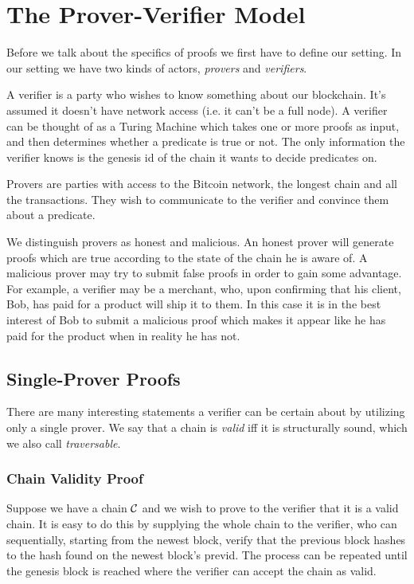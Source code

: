 \section{The Prover-Verifier Model}
Before we talk about the specifics of proofs we first have to define our setting. In our setting we have two kinds of actors, \emph{provers} and \emph{verifiers}.

A verifier is a party who wishes to know something about our blockchain. It's assumed it doesn't have network access (i.e. it can't be a full node). A verifier can be thought of as a Turing Machine which takes one or more proofs as input, and then determines whether a predicate is true or not. The only information the verifier knows is the genesis id of the chain it wants to decide predicates on.

Provers are parties with access to the Bitcoin network, the longest chain and all the transactions. They wish to communicate to the verifier and convince them about a predicate.

We distinguish provers as honest and malicious. An honest prover will generate proofs which are true according to the state of the chain he is aware of. A malicious prover may try to submit false proofs in order to gain some advantage. For example, a verifier may be a merchant, who, upon confirming that his client, Bob, has paid for a product will ship it to them. In this case it is in the best interest of Bob to submit a malicious proof which makes it appear like he has paid for the product when in reality he has not.

\subsection{Single-Prover Proofs}
There are many interesting statements a verifier can be certain about by utilizing only a single prover. We say that a chain is \textit{valid} iff it is structurally sound, which we also call \textit{traversable}.

\subsubsection{Chain Validity Proof}
Suppose we have a chain $\mathcal{C}$ and we wish to prove to the verifier that it is a valid chain. It is easy to do this by supplying the whole chain to the verifier, who can sequentially, starting from the newest block, verify that the previous block hashes to the hash found on the newest block's \textsf{previd}. The process can be repeated until the genesis block is reached where the verifier can accept the chain as valid.


